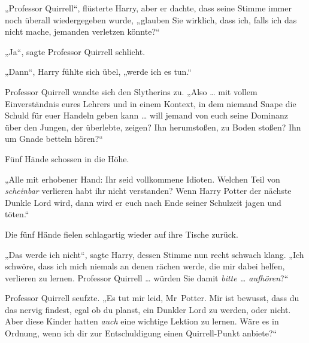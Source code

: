 „Professor Quirrell“, flüsterte Harry, aber er dachte, dass seine Stimme immer noch überall wiedergegeben wurde, „glauben Sie wirklich, dass ich, falls ich das nicht mache, jemanden verletzen könnte?“

„Ja“, sagte Professor Quirrell schlicht.

„Dann“, Harry fühlte sich übel, „werde ich es tun.“

Professor Quirrell wandte sich den Slytherins zu.
„Also … mit vollem Einverständnis eures Lehrers und in einem Kontext, in dem niemand Snape die Schuld für euer Handeln geben kann … will jemand von euch seine Dominanz über den Jungen, der überlebte, zeigen? Ihn herumstoßen, zu Boden stoßen? Ihn um Gnade betteln hören?“

Fünf Hände schossen in die Höhe.

„Alle mit erhobener Hand: Ihr seid vollkommene Idioten. Welchen Teil von \emph{scheinbar} verlieren habt ihr nicht verstanden? Wenn Harry Potter der nächste Dunkle Lord wird, dann wird er euch nach Ende seiner Schulzeit jagen und töten.“

Die fünf Hände fielen schlagartig wieder auf ihre Tische zurück.

„Das werde ich nicht“, sagte Harry, dessen Stimme nun recht schwach klang.
„Ich schwöre, dass ich mich niemals an denen rächen werde, die mir dabei helfen, verlieren zu lernen. Professor Quirrell … würden Sie damit \emph{bitte … aufhören}?“

Professor Quirrell seufzte.
„Es tut mir leid, Mr~Potter. Mir ist bewusst, dass du das nervig findest, egal ob du planst, ein Dunkler Lord zu werden, oder nicht. Aber diese Kinder hatten \emph{auch} eine wichtige Lektion zu lernen. Wäre es in Ordnung, wenn ich dir zur Entschuldigung einen Quirrell-Punkt anbiete?“

